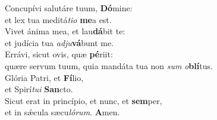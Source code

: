 \evenverse Concupívi salutáre tuum, \textbf{Dó}mine:~\*\\
\evenverse et lex tua meditá\textit{ti}\textit{o} \textbf{me}a est.\\
\oddverse Vivet ánima mea, et lau\textbf{dá}bit te:~\*\\
\oddverse et judícia tua \textit{ad}\textit{ju}\textbf{vá}bunt me.\\
\evenverse Errávi, sicut ovis, quæ \textbf{pé}riit:~\*\\
\evenverse quære servum tuum, quia mandáta tua non \textit{sum} \textit{o}\textbf{blí}tus.\\
\oddverse Glória Patri, et \textbf{Fí}lio,~\*\\
\oddverse et Spirí\textit{tu}\textit{i} \textbf{San}cto.\\
\evenverse Sicut erat in princípio, et nunc, et \textbf{sem}per,~\*\\
\evenverse et in sǽcula sæcu\textit{ló}\textit{rum}. \textbf{A}men.\\
